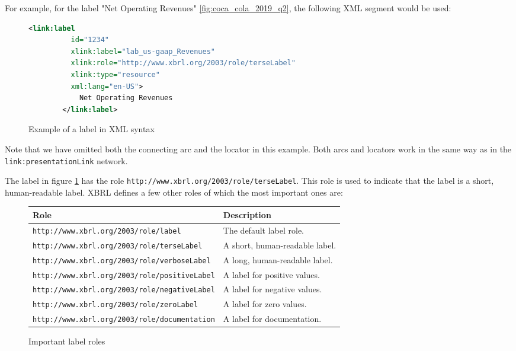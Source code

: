 For example, for the label "Net Operating Revenues" \ref{fig:coca_cola_2019_q2}, the following XML segment would be used:

\begin{figure}[H]
    \begin{lstlisting}[language=XML]
        <link:label 
          id="1234" 
          xlink:label="lab_us-gaap_Revenues" 
          xlink:role="http://www.xbrl.org/2003/role/terseLabel" 
          xlink:type="resource" 
          xml:lang="en-US">
            Net Operating Revenues
        </link:label>

    \end{lstlisting}
    \caption{Example of a label in XML syntax}
    \label{fig:example_label_xml}
\end{figure}

Note that we have omitted both the connecting arc and the locator in this example.
Both arcs and locators work in the same way as in the \texttt{link:presentationLink} network.


The label in figure \ref{fig:example_label_xml} has the role \texttt{http://www.xbrl.org/2003/role/terseLabel}.
This role is used to indicate that the label is a short, human-readable label.
XBRL defines a few other roles of which the most important ones are:

\begin{figure}[H]
    \begin{tabular}{|l|l|}
        \hline
        \textbf{Role} & \textbf{Description} \\ \hline
        \texttt{http://www.xbrl.org/2003/role/label} & The default label role. \\ \hline
        \texttt{http://www.xbrl.org/2003/role/terseLabel} & A short, human-readable label. \\ \hline
        \texttt{http://www.xbrl.org/2003/role/verboseLabel} & A long, human-readable label. \\ \hline
        \texttt{http://www.xbrl.org/2003/role/positiveLabel} & A label for positive values. \\ \hline
        \texttt{http://www.xbrl.org/2003/role/negativeLabel} & A label for negative values. \\ \hline
        \texttt{http://www.xbrl.org/2003/role/zeroLabel} & A label for zero values. \\ \hline
        \texttt{http://www.xbrl.org/2003/role/documentation} & A label for documentation. \\ \hline
    \end{tabular}
    \caption{Important label roles}
    \label{fig:important_label_roles}
\end{figure}


